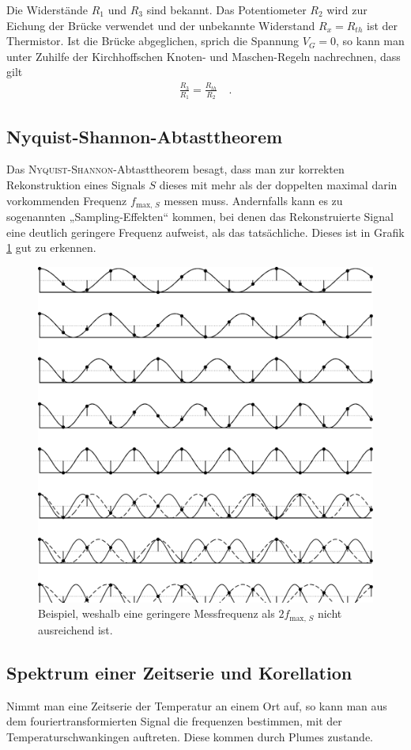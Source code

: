 \documentclass[12pt,a4paper,titlepage,headinclude]{scrartcl}
\numberwithin{equation}{subsection}
\begin{document}
Die Widerstände $R_1$ und $R_3$ sind bekannt.
Das Potentiometer $R_2$ wird zur Eichung der Brücke verwendet und der unbekannte Widerstand $R_x=R_{th}$ ist der Thermistor.
Ist die Brücke abgeglichen, sprich die Spannung $V_G=0$, so kann man unter Zuhilfe der Kirchhoffschen Knoten- und Maschen-Regeln nachrechnen, dass gilt
\begin{align*}
	\frac{R_3}{R_1}=\frac{R_{th}}{R_2}\quad.
\end{align*}

\subsection{Nyquist-Shannon-Abtasttheorem}
Das \textsc{Nyquist-Shannon}-Abtasttheorem besagt, dass man zur korrekten Rekonstruktion eines Signals $S$ dieses mit mehr als der doppelten maximal darin vorkommenden Frequenz $f_{\text{max, }S}$ messen muss.
Andernfalls kann es zu sogenannten „Sampling-Effekten“ kommen, bei denen das Rekonstruierte Signal eine deutlich geringere Frequenz aufweist, als das tatsächliche.
Dieses ist in Grafik \ref{fig:nyquist} gut zu erkennen.
\begin{figure}[h]
  \centering
  \includegraphics[width=0.4\linewidth]{nyquist}
  \caption{Beispiel, weshalb eine geringere Messfrequenz als $2f_{\text{max, }S}$ nicht ausreichend ist.\protect\footnotemark\label{fig:nyquist}}
\end{figure}

\subsection{Spektrum einer Zeitserie und Korellation}
Nimmt man eine Zeitserie der Temperatur an einem Ort auf, so kann man aus dem fouriertransformierten Signal die frequenzen bestimmen, mit der Temperaturschwankingen auftreten.
Diese kommen durch Plumes zustande.
\end{document}
